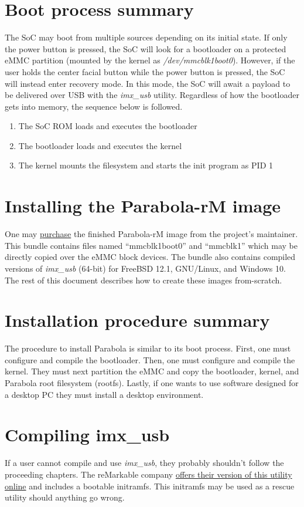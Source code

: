 \documentclass{memoir}
\begin{document}
\section{Boot process summary}
The SoC may boot from multiple sources depending on its initial state. If only the power button is pressed, the SoC will look for a bootloader on a protected eMMC partition (mounted by the kernel as \textit{/dev/mmcblk1boot0}). However, if the user holds the center facial button while the power button is pressed, the SoC will instead enter recovery mode. In this mode, the SoC will await a payload to be delivered over USB with the \textit{imx\_usb} utility. Regardless of how the bootloader gets into memory, the sequence below is followed.

\begin{enumerate}
\item{The SoC ROM loads and executes the bootloader}
\item{The bootloader loads and executes the kernel}
  \item{The kernel mounts the filesystem and starts the init program as PID 1}
\end{enumerate}

\section{Installing the Parabola-rM image}
One may \href{http://www.davisr.me/projects/parabola-rm/}{purchase} the finished Parabola-rM image from the project's maintainer. This bundle contains files named ``mmcblk1boot0'' and ``mmcblk1'' which may be directly copied over the eMMC block devices. The bundle also contains compiled versions of \textit{imx\_usb} (64-bit) for FreeBSD 12.1, GNU/Linux, and Windows 10. The rest of this document describes how to create these images from-scratch.

\section{Installation procedure summary}
The procedure to install Parabola is similar to its boot process. First, one must configure and compile the bootloader. Then, one must configure and compile the kernel. They must next partition the eMMC and copy the bootloader, kernel, and Parabola root filesystem (rootfs). Lastly, if one wants to use software designed for a desktop PC they must install a desktop environment.

\section{Compiling imx\_usb}
If a user cannot compile and use \textit{imx\_usb}, they probably shouldn't follow the proceeding chapters. The reMarkable company \href{https://github.com/remarkable/imx_usb_loader}{offers their version of this utility online} and includes a bootable initramfs. This initramfs may be used as a rescue utility should anything go wrong.
\end{document}
